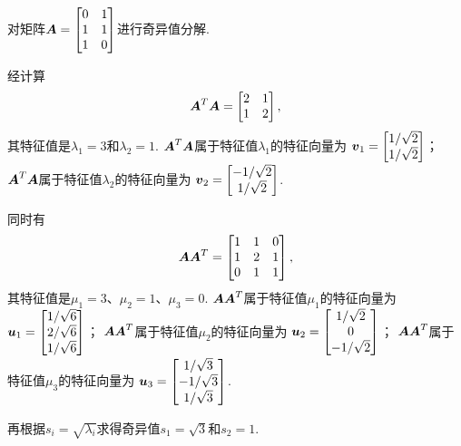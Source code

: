 \begin{example}
对矩阵\(\boldsymbol{A} = \begin{bmatrix} 0 & 1 \\ 1 & 1 \\ 1 & 0 \end{bmatrix}\)进行奇异值分解.
\begin{solution}
经计算\begin{equation*}
	\boldsymbol{A}^T \boldsymbol{A} = \begin{bmatrix} 2 & 1 \\ 1 & 2 \end{bmatrix},
\end{equation*}
其特征值是\(\lambda_1 = 3\)和\(\lambda_2 = 1\).
\(\boldsymbol{A}^T \boldsymbol{A}\)属于特征值\(\lambda_1\)的特征向量为
\(\boldsymbol{v}_1 = \begin{bmatrix} 1/\sqrt{2} \\ 1/\sqrt{2} \end{bmatrix}\)；
\(\boldsymbol{A}^T \boldsymbol{A}\)属于特征值\(\lambda_2\)的特征向量为
\(\boldsymbol{v}_2 = \begin{bmatrix} -1/\sqrt{2} \\ 1/\sqrt{2} \end{bmatrix}\).

同时有\begin{equation*}
	\boldsymbol{A} \boldsymbol{A}^T = \begin{bmatrix} 1 & 1 & 0 \\ 1 & 2 & 1 \\ 0 & 1 & 1 \end{bmatrix},
\end{equation*}
其特征值是\(\mu_1 = 3\)、\(\mu_2 = 1\)、\(\mu_3 = 0\).
\(\boldsymbol{A} \boldsymbol{A}^T\)属于特征值\(\mu_1\)的特征向量为
\(\boldsymbol{u}_1 = \begin{bmatrix} 1/\sqrt{6} \\ 2/\sqrt{6} \\ 1/\sqrt{6} \end{bmatrix}\)；
\(\boldsymbol{A} \boldsymbol{A}^T\)属于特征值\(\mu_2\)的特征向量为
\(\boldsymbol{u}_2 = \begin{bmatrix} 1/\sqrt{2} \\ 0 \\ -1/\sqrt{2} \end{bmatrix}\)；
\(\boldsymbol{A} \boldsymbol{A}^T\)属于特征值\(\mu_3\)的特征向量为
\(\boldsymbol{u}_3 = \begin{bmatrix} 1/\sqrt{3} \\ -1/\sqrt{3} \\ 1/\sqrt{3} \end{bmatrix}\).

再根据\(s_i = \sqrt{\lambda_i}\)求得奇异值\(s_1 = \sqrt{3}\)和\(s_2 = 1\).


\end{solution}
\end{example}
